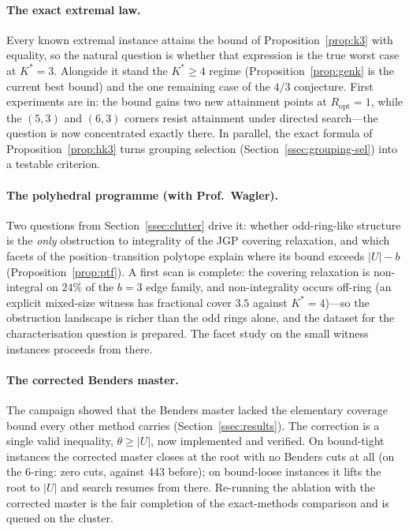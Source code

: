 \documentclass[11pt,a4paper]{article}
\theoremstyle{plain}
\theoremstyle{definition}
\theoremstyle{remark}
\newcommand{\U}{U}
\newcommand{\Kst}{K^{\ast}}
\begin{document}
\paragraph{The exact extremal law.}
Every known extremal instance attains the bound of Proposition~\ref{prop:k3}
with equality, so the natural question is whether that expression is the true
worst case at $\Kst=3$. Alongside it stand the $\Kst\ge4$ regime
(Proposition~\ref{prop:genk} is the current best bound) and the one remaining
case of the $4/3$ conjecture. First experiments are in: the bound gains two new
attainment points at $R_{\mathrm{opt}}=1$, while the $(5,3)$ and $(6,3)$
corners resist attainment under directed search---the question is now
concentrated exactly there. In parallel, the exact formula of
Proposition~\ref{prop:hk3} turns grouping selection
(Section~\ref{ssec:grouping-sel}) into a testable criterion.

\paragraph{The polyhedral programme (with Prof.~Wagler).}
Two questions from Section~\ref{ssec:clutter} drive it: whether odd-ring-like
structure is the \emph{only} obstruction to integrality of the JGP covering
relaxation, and which facets of the position--transition polytope explain where
its bound exceeds $\lvert\U\rvert-b$ (Proposition~\ref{prop:ptf}). A first scan
is complete: the covering relaxation is non-integral on $24\%$ of the $b=3$
edge family, and non-integrality occurs off-ring (an explicit mixed-size
witness has fractional cover $3.5$ against $\Kst=4$)---so the obstruction
landscape is richer than the odd rings alone, and the dataset for the
characterisation question is prepared. The facet study on the small witness
instances proceeds from there.

\paragraph{The corrected Benders master.}
The campaign showed that the Benders master lacked the elementary coverage bound
every other method carries (Section~\ref{ssec:results}). The correction is a
single valid inequality, $\theta\ge\lvert\U\rvert$, now implemented and
verified. On bound-tight instances the corrected master closes at the root with
no Benders cuts at all (on the $6$-ring: zero cuts, against $443$ before); on
bound-loose instances it lifts the root to $\lvert\U\rvert$ and search resumes
from there. Re-running the ablation with the corrected master is the fair
completion of the exact-methods comparison and is queued on the cluster.
\end{document}
